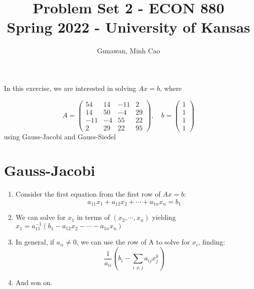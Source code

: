 \documentclass[11pt]{article}
\title{Problem Set 2 - ECON 880\\
	\small Spring 2022 - University of Kansas}
\author{Gunawan, Minh Cao}
\newcommand{\1}{\mathbbm{1}}
\begin{document}
\maketitle	

In this exercise, we are interested in solving $Ax=b$, where

\[A = \begin{pmatrix}
		54 &14& -11& 2 \\ 14 &50& -4& 29 \\ -11 &-4 &55& 22 \\ 2& 29& 22& 95
\end{pmatrix}, \quad b = \begin{pmatrix}
1\\1\\1\\1
\end{pmatrix} \]
using Gauss-Jacobi and Gauss-Siedel
\section{Gauss-Jacobi}
\begin{enumerate}
	\item Consider the first equation from the first row of $Ax=b$:\\
	 $$a_{11}x_1+a_{12}x_2+ \cdots + a_{1n}x_n = b_1 $$
	 \item We can solve for $x_1$ in terms of $(x_2, \cdots ,x_n)$ yielding $x_1 = a_{11}^{-1}(b_1-a_{12}x_2- \cdots - a_{1n}x_n)$
	 \item In general, if $a_{ii} \neq 0$, we can use the row of A to solve for $x_i$, finding:\\
	 
		  $$\frac{1}{a_{ii}} \left(b_i - \sum_{i \neq j} a_{ij} x_{j}^k \right)$$
	\item And son on.
	
\end{enumerate}
\end{document}
